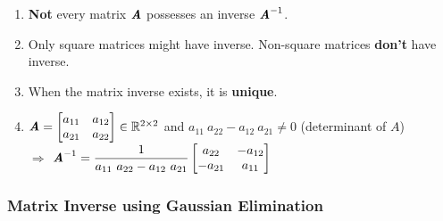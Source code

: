 \begin{enumerate}
    \item \textbf{Not} every matrix $\text{\textbf{\textit{A}}}$ possesses an inverse $\text{\textbf{\textit{A}}}^{-1}$.
    \hfill \cite{mfml/book/mml/Deisenroth-Faisal-Ong}

    \item Only square matrices might have inverse. Non-square matrices \textbf{don't} have inverse.

    \item When the matrix inverse exists, it is \textbf{unique}.
    \hfill \cite{mfml/book/mml/Deisenroth-Faisal-Ong}

    \item $
        \text{\textbf{\textit{A}}} = \begin{bmatrix}
            a_{11} & a_{12} \\
            a_{21} & a_{22} \\
        \end{bmatrix} 
        \in \mathbb{R}^{2\times 2}
    $
    \hspace{1cm} and \hspace{1cm}
    $a_{11}\ a_{22} - a_{12}\ a_{21} \neq 0$ (determinant of $A$)\\[0.4cm] 
    $\Rightarrow$
    $
        \text{\textbf{\textit{A}}}^{-1} = 
        \dfrac{1}{a_{11}\ a_{22} - a_{12}\ a_{21}}
        \begin{bmatrix}
            a_{22} & -a_{12} \\
            -a_{21} & a_{11} \\
        \end{bmatrix}
    $
    \hfill \cite{mfml/book/mml/Deisenroth-Faisal-Ong}

\end{enumerate}



\subsubsection{Matrix Inverse using Gaussian Elimination}


